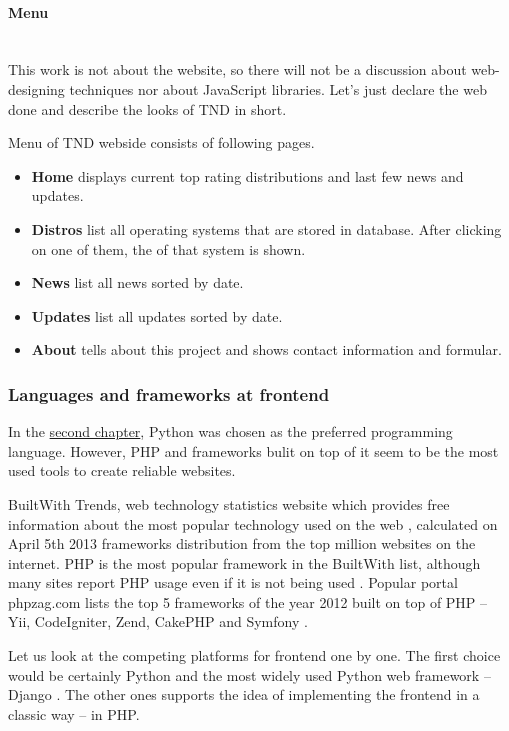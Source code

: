 \documentclass[thesis=B,english]{FITthesis}[2013/04/26]
\newcommand{\myparagraph}[1]{\paragraph{#1}\mbox{}\\}
\begin{document}

\myparagraph{Menu}

This work is not about the website, so there will not be a discussion about web-designing techniques nor about JavaScript libraries. Let's just declare the web done and describe the looks of TND in short.

Menu of TND webside consists of following pages.

\begin{itemize}
	\item \textbf{Home} displays current top rating distributions and last few news and updates. 
	\item \textbf{Distros} list all operating systems that are stored in database. After clicking on one of them, the  of that system is shown.
	\item \textbf{News} list all news sorted by date.
	\item \textbf{Updates} list all updates sorted by date. 
	\item \textbf{About} tells about this project and shows contact information and formular.
\end{itemize}

\subsubsection{Languages and frameworks at frontend}

In the \hyperref[TODO]{second chapter}, Python was chosen as the preferred programming language. However, PHP and frameworks bulit on top of it seem to be the most used tools to create reliable websites.

BuiltWith Trends, web technology statistics website which provides free information about the most popular technology used on the web \cite{builtwith_faq}, calculated on April 5th 2013 frameworks distribution from the top million websites on the internet. PHP is the most popular framework in the BuiltWith list, although many sites report PHP usage even if it is not being used \cite{builtwith_distribution}. Popular portal phpzag.com \cite{mysitecost_phpzag} lists the top 5 frameworks of the year 2012 built on top of PHP -- Yii, CodeIgniter, Zend, CakePHP and Symfony \cite{phpzag}.

Let us look at the competing platforms for frontend one by one. The first choice would be certainly Python and the most widely used Python web framework -- Django \cite{TODO}. The other ones supports the idea of implementing the frontend in a classic way -- in PHP. 
\end{document}
